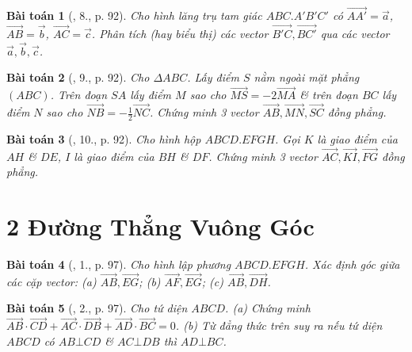 \documentclass{article}
\numberwithin{equation}{section}
\newtheorem{baitoan}{Bài toán}
\begin{document}
\begin{baitoan}[\cite{SGK_Toan_11_hinh_hoc_co_ban}, 8., p. 92]
	Cho hình lăng trụ tam giác $ABC.A'B'C'$ có $\overrightarrow{AA'} = \vec{a}$, $\overrightarrow{AB} = \vec{b}$, $\overrightarrow{AC} = \vec{c}$. Phân tích (hay biểu thị) các vector $\overrightarrow{B'C},\overrightarrow{BC'}$ qua các vector $\vec{a},\vec{b},\vec{c}$.
\end{baitoan}

\begin{baitoan}[\cite{SGK_Toan_11_hinh_hoc_co_ban}, 9., p. 92]
	Cho $\Delta ABC$. Lấy điểm $S$ nằm ngoài mặt phẳng $(ABC)$. Trên đoạn $SA$ lấy điểm $M$ sao cho $\overrightarrow{MS} = -2\overrightarrow{MA}$ \& trên đoạn $BC$ lấy điểm $N$ sao cho $\overrightarrow{NB} = -\frac{1}{2}\overrightarrow{NC}$. Chứng minh 3 vector $\overrightarrow{AB},\overrightarrow{MN},\overrightarrow{SC}$ đồng phẳng.
\end{baitoan}

\begin{baitoan}[\cite{SGK_Toan_11_hinh_hoc_co_ban}, 10., p. 92]
	Cho hình hộp $ABCD.EFGH$. Gọi $K$ là giao điểm của $AH$ \& $DE$, $I$ là giao điểm của $BH$ \& $DF$. Chứng minh 3 vector $\overrightarrow{AC},\overrightarrow{KI},\overrightarrow{FG}$ đồng phẳng.
\end{baitoan}


\section{2 Đường Thẳng Vuông Góc}

\begin{baitoan}[\cite{SGK_Toan_11_hinh_hoc_co_ban}, 1., p. 97]
	Cho hình lập phương $ABCD.EFGH$. Xác định góc giữa các cặp vector: (a) $\overrightarrow{AB},\overrightarrow{EG}$; (b)  $\overrightarrow{AF},\overrightarrow{EG}$; (c) $\overrightarrow{AB},\overrightarrow{DH}$.
\end{baitoan}

\begin{baitoan}[\cite{SGK_Toan_11_hinh_hoc_co_ban}, 2., p. 97]
	Cho tứ diện $ABCD$. (a) Chứng minh $\overrightarrow{AB}\cdot\overrightarrow{CD} + \overrightarrow{AC}\cdot\overrightarrow{DB} + \overrightarrow{AD}\cdot\overrightarrow{BC} = 0$. (b) Từ đẳng thức trên suy ra nếu tứ diện $ABCD$ có $AB\bot CD$ \& $AC\bot DB$ thì $AD\bot BC$.
\end{baitoan}
\end{document}

